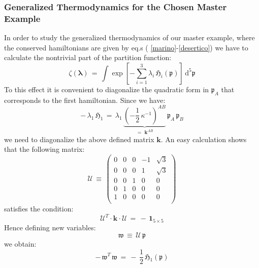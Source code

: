 \documentclass[10pt,a4paper]{article}
\newcommand{\ft}[2]{{\textstyle\frac{#1}{#2}}}
\begin{document}
 \subsubsection{Generalized Thermodynamics for the Chosen Master Example}
 In order to study the generalized thermodynamics of our master example, where the conserved hamiltonians are given by eq.s ( \ref{marino}-\ref{desertico}) we have to calculate the nontrivial part of the partition function:
 \begin{equation}\label{notrivialo}
   \zeta(\boldsymbol{\lambda}) \, = \, \int\exp\left[-\sum_{i=1}^3\lambda_i \, \mathfrak{H}_i (\boldsymbol{\mathfrak{p}})\right]
   \, \mathrm{d}^5\boldsymbol{\mathfrak{p}}
 \end{equation}
 To this effect it is convenient to diagonalize the quadratic form in $\mathfrak{p}_A$ that corresponds to the first hamiltonian. Since we have:
 \begin{equation}\label{diagahamilla}
   -\,\lambda_1 \, \mathfrak{H}_1 \, = \, \lambda_1 \, \underbrace{\left( -\ft 12 \, \kappa^{-1}\right)^{AB}}_{=\,\,\boldsymbol{k}^{AB}} \, \mathfrak{p}_A\, \mathfrak{p}_B
 \end{equation}
 we need to diagonalize the above defined matrix $\boldsymbol{k}$. An easy calculation shows that the following matrix:
 \begin{equation}\label{carnenonvale}
   \mathcal{U} \, \equiv \, \left(
\begin{array}{ccccc}
 0 & 0 & 0 & -1 & \sqrt{3} \\
 0 & 0 & 0 & 1 & \sqrt{3} \\
 0 & 0 & 1 & 0 & 0 \\
 0 & 1 & 0 & 0 & 0 \\
 1 & 0 & 0 & 0 & 0 \\
\end{array}
\right)
 \end{equation}
 satisfies the condition:
 \begin{equation}\label{ufesta}
   \mathcal{U}^T\cdot \boldsymbol{k} \cdot \mathcal{U} \, = \, - \, \mathbf{1}_{5\times 5}
 \end{equation}
 Hence defining new variables:
 \begin{equation}\label{candillo}
   \boldsymbol{\mathfrak{w}} \, \equiv \, \mathcal{U}\, \boldsymbol{\mathfrak{p}}
 \end{equation}
 we obtain:
 \begin{equation}\label{frescovile}
   - \, \boldsymbol{\mathfrak{w}}^T \, \boldsymbol{\mathfrak{w}} \, = \, - \, \ft 12 \, \mathfrak{H}_1(\boldsymbol{\mathfrak{p}})
 \end{equation}
\end{document}
